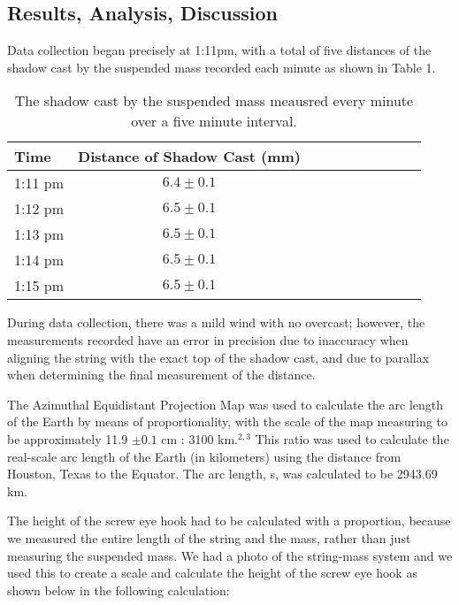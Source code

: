 \documentclass[twoside,10pt]{article}
\begin{document}
\begin{multicols}{2}
		

		
		\section{Results, Analysis, Discussion}
		
		Data collection began precisely at 1:11pm, with a total of five distances of the shadow cast by the suspended mass recorded each minute as shown in Table 1. 
		
			\begin{table}[H]
			\centering
			\caption{The shadow cast by the suspended mass meausred every minute over a five minute interval.}
			\begin{tabular}{l c c rrrrrrr}
				\toprule				
				Time & Distance of Shadow Cast (mm) \\ [1ex]
				\midrule
				1:11 pm & $6.4 \pm 0.1 $  \\ [1.5ex]
				1:12 pm & $6.5 \pm 0.1$  \\ [1.5ex]
				1:13 pm & $6.5  \pm 0.1 $ \\ [1.5ex]
				1:14 pm & $6.5 \pm 0.1$ \\ [1.5ex]
				1:15 pm & $6.5 \pm 0.1$ \\ [1.5ex]
				\bottomrule
			\end{tabular}
		\end{table}
					
		During data collection, there was a mild wind with no overcast; however, the measurements recorded have an error in precision due to inaccuracy when aligning the string with the exact top of the shadow cast, and due to parallax when determining the final measurement of the distance. 

		\indent The Azimuthal Equidistant Projection Map was used to calculate the arc length of the Earth by means of proportionality, with the scale of the map measuring to be approximately 11.9 $\pm0.1$ cm : 3100 km.$^{2,3}$ This ratio was used to calculate the real-scale arc length of the Earth (in kilometers) using the distance from Houston, Texas to the Equator. The arc length, s, was calculated to be 2943.69 km. 
		
		\indent  The height of the screw eye hook had to be calculated with a proportion, because we measured the entire length of the string and the mass, rather than just measuring the suspended mass. We had a photo of the string-mass system and we used this to create a scale and calculate the height of the screw eye hook as shown below in the following calculation:
		

\end{multicols}
\end{document}
